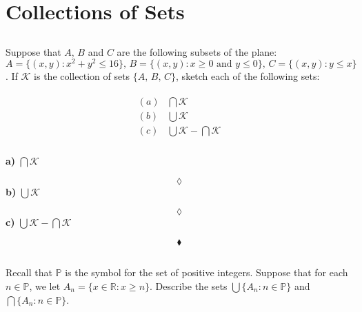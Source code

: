  \section{Collections of Sets}
\subsection{}
\begin{tcolorbox}
Suppose that $A,\, B$ and $C$ are the following subsets of the plane:\\
$A=\{(x,y):x^2+y^2\le 16\},\, B= \{(x,y):x\ge 0 \text{ and } y \le 0\},\, C=\{(x,y): y \le x\}$. If $\mathscr{K}$ is the collection of sets $\{A,\, B,\, C\}$, sketch each of the following sets:

\begin{align*}
\begin{array}{ll}
(a)&\bigcap \mathscr{K}\\
(b)&\bigcup \mathscr{K}\\
(c)&\bigcup \mathscr{K}-\bigcap \mathscr{K}\\
\end{array}
\end{align*}
\end{tcolorbox}
\begin{figure}[H]%
    \centering
\label{fig:fig_p8b}
\end{figure}
\textbf{a)} $\bigcap \mathscr{K}$
\begin{figure}[H]%
    \centering
\label{fig:fig_p8b}
\end{figure}
$$\lozenge$$
\textbf{b)} $\bigcup \mathscr{K}$
\begin{figure}[H]%
    \centering
\label{fig:fig_p8b}
\end{figure}
$$\lozenge$$
\textbf{c)} $\bigcup \mathscr{K}-\bigcap \mathscr{K}$
\begin{figure}[H]%
    \centering
\label{fig:fig_p8b}
\end{figure}
$$\blacklozenge$$
\newpage
\subsection{}
\begin{tcolorbox}
Recall that $\mathbb{P}$ is the symbol for the set of positive integers. Suppose that for each $n\in \mathbb{P}$, we let $A_n=\{x\in \mathbb{R}: x\ge n\}$. Describe the sets $\bigcup\{A_n:n\in\mathbb{P}\}$ and $\bigcap\{A_n:n\in\mathbb{P}\}$.
\end{tcolorbox}

